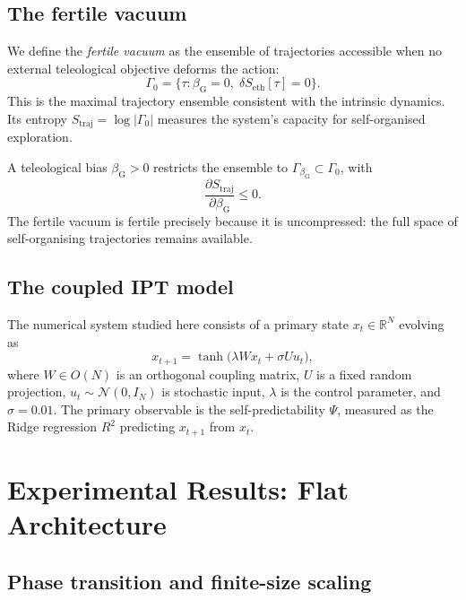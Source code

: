 \documentclass[11pt,a4paper]{article}
\newcommand{\bG}{\beta_{\mathrm{G}}}
\newcommand{\Straj}{S_{\mathrm{traj}}}
\newcommand{\Seth}{S_{\mathrm{eth}}}
\begin{document}
\subsection{The fertile vacuum}

We define the \emph{fertile vacuum} as the ensemble of trajectories
accessible when no external teleological objective deforms the action:
\begin{equation}
  \Gamma_0 = \{\tau : \bG = 0, \; \delta\Seth[\tau] = 0\}.
\end{equation}
This is the maximal trajectory ensemble consistent with the intrinsic
dynamics. Its entropy $\Straj = \log|\Gamma_0|$ measures the system's
capacity for self-organised exploration.

A teleological bias $\bG > 0$ restricts the ensemble to
$\Gamma_{\bG} \subset \Gamma_0$, with
\begin{equation}
  \frac{\partial \Straj}{\partial \bG} \leq 0.
  \label{eq:entropy_monotone}
\end{equation}
The fertile vacuum is fertile precisely because it is uncompressed: the
full space of self-organising trajectories remains available.

\subsection{The coupled IPT model}

The numerical system studied here consists of a primary state
$x_t \in \mathbb{R}^N$ evolving as
\begin{equation}
  x_{t+1} = \tanh\!\bigl(\lambda W x_t + \sigma U u_t\bigr),
  \label{eq:dynamics}
\end{equation}
where $W \in O(N)$ is an orthogonal coupling matrix, $U$ is a fixed
random projection, $u_t \sim \mathcal{N}(0, I_N)$ is stochastic input,
$\lambda$ is the control parameter, and $\sigma = 0.01$. The primary
observable is the self-predictability $\Psi$, measured as the Ridge
regression $R^2$ predicting $x_{t+1}$ from $x_t$.

\section{Experimental Results: Flat Architecture}

\subsection{Phase transition and finite-size scaling}
\label{sec:scaling}
\end{document}
